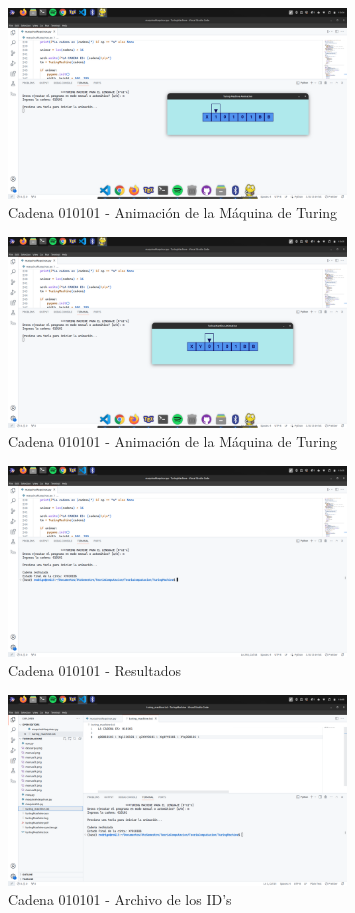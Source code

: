 \documentclass[11pt]{article} %
\begin{document}
	\newpage
	\begin{figure}[h]
		\centering
		\includegraphics[width=0.8\textwidth]{manual6}
		\caption{Cadena 010101 - Animación de la Máquina de Turing}
	\end{figure}
	\begin{figure}[h]
		\centering
		\includegraphics[width=0.8\textwidth]{manual7}
		\caption{Cadena 010101 - Animación de la Máquina de Turing}
	\end{figure}
	
	\newpage	
	\begin{figure}[h]
		\centering
		\includegraphics[width=0.8\textwidth]{manual8}
		\caption{Cadena 010101 - Resultados}
	\end{figure}
	\begin{figure}[h]
		\centering
		\includegraphics[width=0.8\textwidth]{arch2}
		\caption{Cadena 010101 - Archivo de los ID's}
	\end{figure}
	
\end{document}
